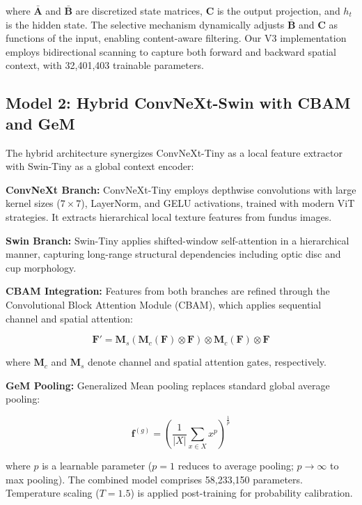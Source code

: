 \documentclass[conference]{IEEEtran}
\begin{document}
where $\bar{\mathbf{A}}$ and $\bar{\mathbf{B}}$ are 
discretized state matrices, $\mathbf{C}$ is the output 
projection, and $h_t$ is the hidden state. The 
selective mechanism dynamically adjusts $\bar{\mathbf{B}}$ 
and $\mathbf{C}$ as functions of the input, enabling 
content-aware filtering. Our V3 implementation 
employs bidirectional scanning to capture both 
forward and backward spatial context, with 
32,401,403 trainable parameters.

\subsection{Model 2: Hybrid ConvNeXt-Swin with CBAM and GeM}

The hybrid architecture synergizes ConvNeXt-Tiny 
as a local feature extractor with Swin-Tiny as a 
global context encoder:

\textbf{ConvNeXt Branch:} ConvNeXt-Tiny employs 
depthwise convolutions with large kernel sizes 
($7 \times 7$), LayerNorm, and GELU activations, 
trained with modern ViT strategies. It extracts 
hierarchical local texture features from fundus images.

\textbf{Swin Branch:} Swin-Tiny applies shifted-window 
self-attention in a hierarchical manner, capturing 
long-range structural dependencies including 
optic disc and cup morphology.

\textbf{CBAM Integration:} Features from both branches 
are refined through the Convolutional Block Attention 
Module (CBAM), which applies sequential channel and 
spatial attention:

\begin{equation}
\mathbf{F}' = \mathbf{M}_s(\mathbf{M}_c(\mathbf{F}) 
\otimes \mathbf{F}) \otimes \mathbf{M}_c(\mathbf{F}) 
\otimes \mathbf{F}
\end{equation}

where $\mathbf{M}_c$ and $\mathbf{M}_s$ denote channel 
and spatial attention gates, respectively.

\textbf{GeM Pooling:} Generalized Mean pooling replaces 
standard global average pooling:

\begin{equation}
\mathbf{f}^{(g)} = \left( \frac{1}{|X|} 
\sum_{x \in X} x^p \right)^{\frac{1}{p}}
\end{equation}

where $p$ is a learnable parameter ($p=1$ reduces to 
average pooling; $p \to \infty$ to max pooling). 
The combined model comprises 58,233,150 parameters. 
Temperature scaling ($T=1.5$) is applied post-training 
for probability calibration.
\end{document}
